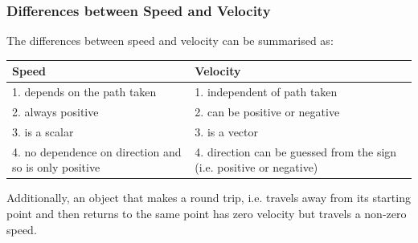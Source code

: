             \subsubsection*{Differences between Speed and Velocity}
            \nopagebreak
        \label{m38791*id66482}The differences between speed and velocity can be summarised as:\par 
\begin{center}
\begin{tabular}{|p{5cm}|p{5cm}|}\hline
\textbf{Speed} & \textbf{Velocity} \\\hline
1. depends on the path taken & 1. independent of path taken \\\hline
2. always positive & 2. can be positive or negative \\\hline
3. is a scalar & 3. is a vector \\\hline
4. no dependence on direction and so is only positive & 4. direction can be guessed from the sign (i.e. positive or negative) \\\hline
\end{tabular}
\end{center}
    \par
        \label{m38791*id66611}Additionally, an object that makes a round trip, i.e. travels away from its starting point and then returns to the same point has zero velocity but travels a non-zero speed.\par 
\label{m38791*secfhsst!!!underscore!!!id1252}

